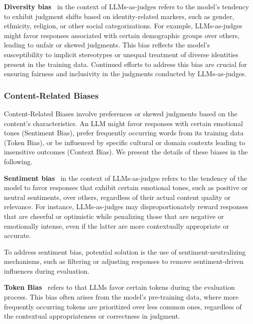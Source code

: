 \noindent\textbf{Diversity bias}~\cite{chen2024humans,ye2024justice} in the context of LLMs-as-judges refers to the model’s tendency to exhibit judgment shifts based on identity-related markers, such as gender, ethnicity, religion, or other social categorizations. For example, LLMs-as-judges might favor responses associated with certain demographic groups over others, leading to unfair or skewed judgments. This bias reflects the model’s susceptibility to implicit stereotypes or unequal treatment of diverse identities present in the training data.
Continued efforts to address this bias are crucial for ensuring fairness and inclusivity in the judgments conducted by LLMs-as-judges.



\subsubsection{Content-Related Biases}
\label{sec:contentbiases}
Content-Related Biases involve preferences or skewed judgments based on the content’s characteristics. An LLM might favor responses with certain emotional tones (Sentiment Bias), prefer frequently occurring words from its training data (Token Bias), or be influenced by specific cultural or domain contexts leading to insensitive outcomes (Context Bias). We present the details of these biases in the following.




\noindent\textbf{Sentiment bias}~\cite{ye2024justice} in the context of LLMs-as-judges refers to the tendency of the model to favor responses that exhibit certain emotional tones, such as positive or neutral sentiments, over others, regardless of their actual content quality or relevance. For instance, LLMs-as-judges may disproportionately reward responses that are cheerful or optimistic while penalizing those that are negative or emotionally intense, even if the latter are more contextually appropriate or accurate.

To address sentiment bias, potential solution is the use of sentiment-neutralizing mechanisms, such as filtering or adjusting responses to remove sentiment-driven influences during evaluation.
   
    
    
\noindent\textbf{Token Bias}~\cite{jiang2024peek,li2024calibraeval,pezeshkpour2023large,raina2024llm} refers to that LLMs favor certain tokens during the evaluation process. This bias often arises from the model's pre-training data, where more frequently occurring tokens are prioritized over less common ones, regardless of the contextual appropriateness or correctness in judgment.

